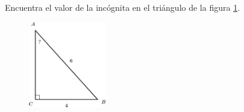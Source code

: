 Encuentra el valor de la incógnita en el triángulo de la figura \ref{fig:angle_functrig_03}.
\begin{figure}[H]
    \begin{center}
        \includegraphics[width=0.3\textwidth]{../images/angle_functrig_03.png}
    \end{center}
    \caption{}
    \label{fig:angle_functrig_03}
\end{figure}